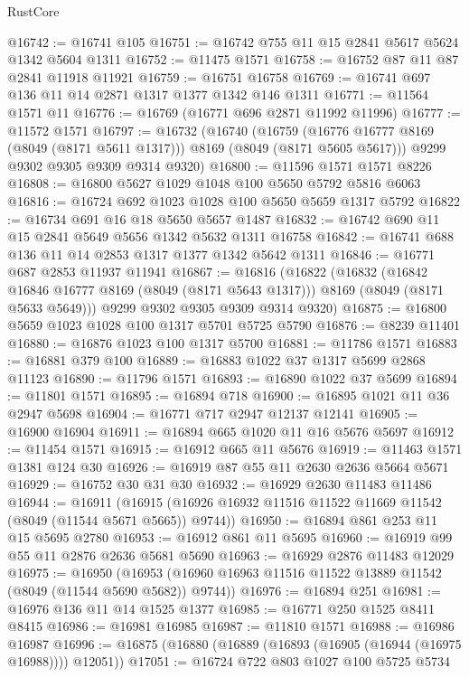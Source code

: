 \begin{lexlean}{RustCore}
\begin{coremodule}
@16742 := @16741 @105
@16751 := @16742 @755 @11 @15 @2841 @5617 @5624 @1342 @5604 @1311
@16752 := @11475 @1571
@16758 := @16752 @87 @11 @87 @2841 @11918 @11921
@16759 := @16751 @16758
@16769 := @16741 @697 @136 @11 @14 @2871 @1317 @1377 @1342 @146 @1311
@16771 := @11564 @1571 @11
@16776 := @16769 (@16771 @696 @2871 @11992 @11996)
@16777 := @11572 @1571
@16797 := @16732
    (@16740
      (@16759 (@16776 @16777 @8169 (@8049 (@8171 @5611 @1317))) @8169 (@8049 (@8171 @5605 @5617)))
      @9299
      @9302
      @9305
      @9309
      @9314
      @9320)
@16800 := @11596 @1571 @1571 @8226
@16808 := @16800 @5627 @1029 @1048 @100 @5650 @5792 @5816 @6063
@16816 := @16724 @692 @1023 @1028 @100 @5650 @5659 @1317 @5792
@16822 := @16734 @691 @16 @18 @5650 @5657 @1487
@16832 := @16742 @690 @11 @15 @2841 @5649 @5656 @1342 @5632 @1311 @16758
@16842 := @16741 @688 @136 @11 @14 @2853 @1317 @1377 @1342 @5642 @1311
@16846 := @16771 @687 @2853 @11937 @11941
@16867 := @16816
    (@16822
      (@16832
        (@16842 @16846 @16777 @8169 (@8049 (@8171 @5643 @1317)))
        @8169
        (@8049 (@8171 @5633 @5649)))
      @9299
      @9302
      @9305
      @9309
      @9314
      @9320)
@16875 := @16800 @5659 @1023 @1028 @100 @1317 @5701 @5725 @5790
@16876 := @8239 @11401
@16880 := @16876 @1023 @100 @1317 @5700
@16881 := @11786 @1571
@16883 := @16881 @379 @100
@16889 := @16883 @1022 @37 @1317 @5699 @2868 @11123
@16890 := @11796 @1571
@16893 := @16890 @1022 @37 @5699
@16894 := @11801 @1571
@16895 := @16894 @718
@16900 := @16895 @1021 @11 @36 @2947 @5698
@16904 := @16771 @717 @2947 @12137 @12141
@16905 := @16900 @16904
@16911 := @16894 @665 @1020 @11 @16 @5676 @5697
@16912 := @11454 @1571
@16915 := @16912 @665 @11 @5676
@16919 := @11463 @1571 @1381 @124 @30
@16926 := @16919 @87 @55 @11 @2630 @2636 @5664 @5671
@16929 := @16752 @30 @31 @30
@16932 := @16929 @2630 @11483 @11486
@16944 := @16911
    (@16915 (@16926 @16932 @11516 @11522 @11669 @11542 (@8049 (@11544 @5671 @5665)) @9744))
@16950 := @16894 @861 @253 @11 @15 @5695 @2780
@16953 := @16912 @861 @11 @5695
@16960 := @16919 @99 @55 @11 @2876 @2636 @5681 @5690
@16963 := @16929 @2876 @11483 @12029
@16975 := @16950
    (@16953 (@16960 @16963 @11516 @11522 @13889 @11542 (@8049 (@11544 @5690 @5682)) @9744))
@16976 := @16894 @251
@16981 := @16976 @136 @11 @14 @1525 @1377
@16985 := @16771 @250 @1525 @8411 @8415
@16986 := @16981 @16985
@16987 := @11810 @1571
@16988 := @16986 @16987
@16996 := @16875 (@16880 (@16889 (@16893 (@16905 (@16944 (@16975 @16988)))) @12051))
@17051 := @16724
    @722
    @803
    @1027
    @100
    @5725
    @5734

\end{coremodule}
\end{lexlean}
